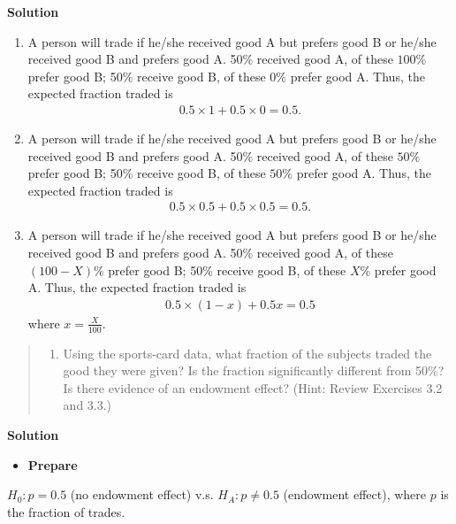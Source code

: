 \documentclass[
]{book}
\providecommand{\tightlist}{%
  \setlength{\itemsep}{0pt}\setlength{\parskip}{0pt}}
\begin{document}
\textbf{Solution}

\begin{enumerate}
\def\labelenumi{\roman{enumi}.}
\item
  A person will trade if he/she received good A but prefers good B or he/she received good B and prefers good A. 50\% received good A, of these \(100\%\) prefer good B; 50\% receive good B, of these \(0\%\) prefer good A. Thus, the expected fraction traded is
  \begin{align}
  0.5 \times 1 + 0.5\times 0 = 0.5.
  \end{align}
\item
  A person will trade if he/she received good A but prefers good B or he/she received good B and prefers good A. 50\% received good A, of these \(50\%\) prefer good B; 50\% receive good B, of these \(50\%\) prefer good A. Thus, the expected fraction traded is
  \begin{align}
  0.5 \times 0.5 + 0.5\times 0.5 = 0.5.
  \end{align}
\item
  A person will trade if he/she received good A but prefers good B or he/she received good B and prefers good A. 50\% received good A, of these \((100-X)\%\) prefer good B; 50\% receive good B, of these \(X\%\) prefer good A. Thus, the expected fraction traded is
  \begin{align}
  0.5 \times (1-x) + 0.5x = 0.5
  \end{align}
  where \(x = \frac{X}{100}\).
\end{enumerate}

\begin{quote}
\begin{enumerate}
\def\labelenumi{\alph{enumi}.}
\setcounter{enumi}{1}
\tightlist
\item
  Using the sports-card data, what fraction of the subjects traded the good they were given? Is the fraction significantly different from 50\%? Is there evidence of an endowment effect? (Hint: Review Exercises 3.2 and 3.3.)
\end{enumerate}
\end{quote}

\textbf{Solution}

\begin{itemize}
\tightlist
\item
  \textbf{Prepare}
\end{itemize}

\(H_0: p= 0.5\) (no endowment effect) v.s. \(H_A: p \neq 0.5\) (endowment effect), where \(p\) is the fraction of trades.
\end{document}
